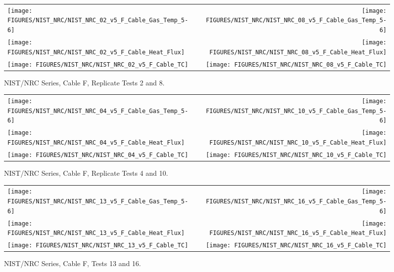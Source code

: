 \begin{figure}[h]
\begin{tabular*}{\textwidth}{l@{\extracolsep{\fill}}r}
\texttt{[image: FIGURES/NIST\_NRC/NIST\_NRC\_02\_v5\_F\_Cable\_Gas\_Temp\_5-6]} &
\texttt{[image: FIGURES/NIST\_NRC/NIST\_NRC\_08\_v5\_F\_Cable\_Gas\_Temp\_5-6]} \\
\texttt{[image: FIGURES/NIST\_NRC/NIST\_NRC\_02\_v5\_F\_Cable\_Heat\_Flux]} &
\texttt{[image: FIGURES/NIST\_NRC/NIST\_NRC\_08\_v5\_F\_Cable\_Heat\_Flux]} \\
\texttt{[image: FIGURES/NIST\_NRC/NIST\_NRC\_02\_v5\_F\_Cable\_TC]} &
\texttt{[image: FIGURES/NIST\_NRC/NIST\_NRC\_08\_v5\_F\_Cable\_TC]}
\end{tabular*}
\caption{NIST/NRC Series, Cable F, Replicate Tests 2 and 8.}
\label{NIST_NRC_F_2_and_8}
\end{figure}

\begin{figure}[h]
\begin{tabular*}{\textwidth}{l@{\extracolsep{\fill}}r}
\texttt{[image: FIGURES/NIST\_NRC/NIST\_NRC\_04\_v5\_F\_Cable\_Gas\_Temp\_5-6]} &
\texttt{[image: FIGURES/NIST\_NRC/NIST\_NRC\_10\_v5\_F\_Cable\_Gas\_Temp\_5-6]} \\
\texttt{[image: FIGURES/NIST\_NRC/NIST\_NRC\_04\_v5\_F\_Cable\_Heat\_Flux]} &
\texttt{[image: FIGURES/NIST\_NRC/NIST\_NRC\_10\_v5\_F\_Cable\_Heat\_Flux]} \\
\texttt{[image: FIGURES/NIST\_NRC/NIST\_NRC\_04\_v5\_F\_Cable\_TC]} &
\texttt{[image: FIGURES/NIST\_NRC/NIST\_NRC\_10\_v5\_F\_Cable\_TC]}
\end{tabular*}
\caption{NIST/NRC Series, Cable F, Replicate Tests 4 and 10.}
\label{NIST_NRC_F_4_and_10}
\end{figure}

\begin{figure}[h]
\begin{tabular*}{\textwidth}{l@{\extracolsep{\fill}}r}
\texttt{[image: FIGURES/NIST\_NRC/NIST\_NRC\_13\_v5\_F\_Cable\_Gas\_Temp\_5-6]} &
\texttt{[image: FIGURES/NIST\_NRC/NIST\_NRC\_16\_v5\_F\_Cable\_Gas\_Temp\_5-6]} \\
\texttt{[image: FIGURES/NIST\_NRC/NIST\_NRC\_13\_v5\_F\_Cable\_Heat\_Flux]} &
\texttt{[image: FIGURES/NIST\_NRC/NIST\_NRC\_16\_v5\_F\_Cable\_Heat\_Flux]} \\
\texttt{[image: FIGURES/NIST\_NRC/NIST\_NRC\_13\_v5\_F\_Cable\_TC]} &
\texttt{[image: FIGURES/NIST\_NRC/NIST\_NRC\_16\_v5\_F\_Cable\_TC]}
\end{tabular*}
\caption{NIST/NRC Series, Cable F, Tests 13 and 16.}
\label{NIST_NRC_F_13_and_16}
\end{figure}

